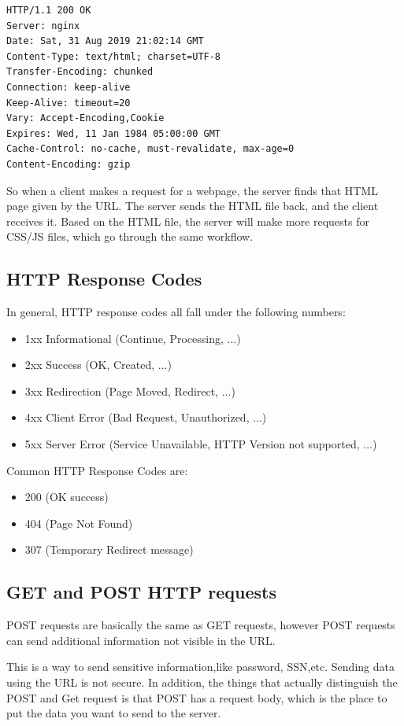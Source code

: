 \documentclass[fancy,11pt,titlestyle=display]{style/elegantbook}
\begin{document}
\begin{lstlisting}
HTTP/1.1 200 OK
Server: nginx
Date: Sat, 31 Aug 2019 21:02:14 GMT
Content-Type: text/html; charset=UTF-8
Transfer-Encoding: chunked
Connection: keep-alive
Keep-Alive: timeout=20
Vary: Accept-Encoding,Cookie
Expires: Wed, 11 Jan 1984 05:00:00 GMT
Cache-Control: no-cache, must-revalidate, max-age=0
Content-Encoding: gzip
\end{lstlisting}

So when a client makes a request for a webpage, the server finds that HTML page given by the URL. The server sends the HTML file back, and the client receives it. Based on the HTML file, the server will make more requests for CSS/JS files, which go through the same workflow.

\subsection*{HTTP Response Codes}

In general, HTTP response codes all fall under the following numbers:
\begin{itemize}
    \item 1xx Informational (Continue, Processing, ...)
    \item 2xx Success (OK, Created, ...)
    \item 3xx Redirection (Page Moved, Redirect, ...)
    \item 4xx Client Error (Bad Request, Unauthorized, ...)
    \item 5xx Server Error (Service Unavailable, HTTP Version not supported, ...)
\end{itemize}

Common HTTP Response Codes are:
\begin{itemize}
    \item 200 (OK success)
    \item 404 (Page Not Found)
    \item 307 (Temporary Redirect message)
\end{itemize}

\subsection*{GET and POST HTTP requests}

POST requests are basically the same as GET requests, however POST requests can send additional information not visible in the URL.
\par This is a way to send sensitive information,like password, SSN,etc. Sending data using the URL is not secure. In addition, the things that actually distinguish the POST and Get request is that POST has a request body, which is the place to put the data you want to send to the server.
\end{document}
